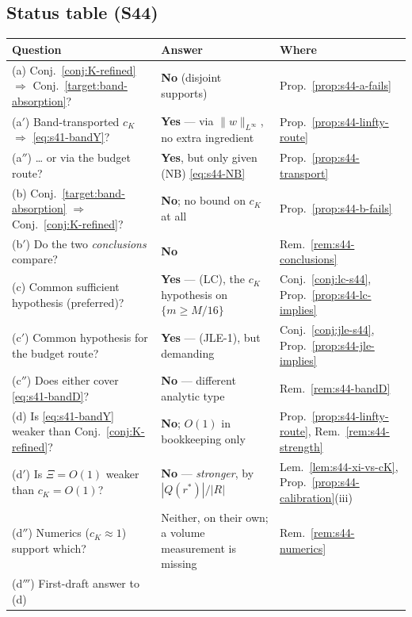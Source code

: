 \documentclass[11pt]{article}
\theoremstyle{definition}
\theoremstyle{remark}
\begin{document}
\subsection{Status table (S44)}
\label{subsec:s44-status}

\begin{center}
\begin{tabular}{lll}
\hline
Question & Answer & Where \\
\hline
(a) Conj.~\ref{conj:K-refined} $\Rightarrow$ Conj.~\ref{target:band-absorption}?
  & \textbf{No} (disjoint supports) & Prop.~\ref{prop:s44-a-fails} \\
(a$'$) Band-transported $c_K$ $\Rightarrow$ \eqref{eq:s41-bandY}?
  & \textbf{Yes} --- via $\|w\|_{L^\infty}$, no extra ingredient
    & Prop.~\ref{prop:s44-linfty-route} \\
(a$''$) \dots{} or via the budget route?
  & \textbf{Yes}, but only given (NB) \eqref{eq:s44-NB}
    & Prop.~\ref{prop:s44-transport} \\
(b) Conj.~\ref{target:band-absorption} $\Rightarrow$ Conj.~\ref{conj:K-refined}?
  & \textbf{No}; no bound on $c_K$ at all & Prop.~\ref{prop:s44-b-fails} \\
(b$'$) Do the two \emph{conclusions} compare?
  & \textbf{No} & Rem.~\ref{rem:s44-conclusions} \\
(c) Common sufficient hypothesis (preferred)?
  & \textbf{Yes} --- (LC), the $c_K$ hypothesis on $\{m\geq M/16\}$
    & Conj.~\ref{conj:lc-s44}, Prop.~\ref{prop:s44-lc-implies} \\
(c$'$) Common hypothesis for the budget route?
  & \textbf{Yes} --- (JLE-1), but demanding
    & Conj.~\ref{conj:jle-s44}, Prop.~\ref{prop:s44-jle-implies} \\
(c$''$) Does either cover \eqref{eq:s41-bandD}?
  & \textbf{No} --- different analytic type & Rem.~\ref{rem:s44-bandD} \\
(d) Is \eqref{eq:s41-bandY} weaker than Conj.~\ref{conj:K-refined}?
  & \textbf{No}; $O(1)$ in bookkeeping only
    & Prop.~\ref{prop:s44-linfty-route}, Rem.~\ref{rem:s44-strength} \\
(d$'$) Is $\Xi=O(1)$ weaker than $c_K=O(1)$?
  & \textbf{No} --- \emph{stronger}, by $|Q(r^*)|/|R|$
    & Lem.~\ref{lem:s44-xi-vs-cK}, Prop.~\ref{prop:s44-calibration}(iii) \\
(d$''$) Numerics ($c_K\approx1$) support which?
  & Neither, on their own; a volume measurement is missing
    & Rem.~\ref{rem:s44-numerics} \\
(d$'''$) First-draft answer to (d)

\end{tabular}
\end{center}
\end{document}
